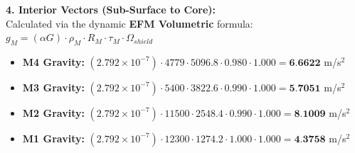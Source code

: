 \documentclass[11pt, a4paper]{article}
\begin{document}
  \vspace{0.5em}
  \noindent \textbf{4. Interior Vectors (Sub-Surface to Core):} \\[0.5em]
  \hspace*{1em} Calculated via the dynamic \textbf{EFM Volumetric} formula: $g_M = (\alpha G) \cdot \rho_{M} \cdot R_M \cdot \tau_M \cdot \Omega_{shield}$
  \begin{itemize}
    \item \textbf{M4 Gravity:} $(2.792 \times 10^{-7}) \cdot 4779 \cdot 5096.8 \cdot 0.980 \cdot 1.000 = \textbf{6.6622}$ m/s$^2$
    \item \textbf{M3 Gravity:} $(2.792 \times 10^{-7}) \cdot 5400 \cdot 3822.6 \cdot 0.990 \cdot 1.000 = \textbf{5.7051}$ m/s$^2$
    \item \textbf{M2 Gravity:} $(2.792 \times 10^{-7}) \cdot 11500 \cdot 2548.4 \cdot 0.990 \cdot 1.000 = \textbf{8.1009}$ m/s$^2$
    \item \textbf{M1 Gravity:} $(2.792 \times 10^{-7}) \cdot 12300 \cdot 1274.2 \cdot 1.000 \cdot 1.000 = \textbf{4.3758}$ m/s$^2$
  \end{itemize}
\end{document}
